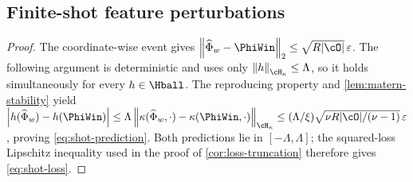\subsection{Finite-shot feature perturbations}

\begin{proof}
The coordinate-wise event gives
\(\norm{\widehat\Phi_w-\PhiWin}_2\leq\sqrt{R|\cO|}\,\varepsilon\).
The following argument is deterministic and uses only
\(\norm{h}_{\cH_\kappa}\leq\Lambda\), so it holds simultaneously for every
\(h\in\Hball\). The reproducing property and
\cref{lem:matern-stability} yield
\(
\abs{h(\widehat\Phi_w)-h(\PhiWin)}
\leq
\Lambda\norm{\kappa(\widehat\Phi_w,\cdot)-\kappa(\PhiWin,\cdot)}_{\cH_\kappa}
\leq
(\Lambda/\xi)\sqrt{\nu R|\cO|/(\nu-1)}\,\varepsilon
\), proving \cref{eq:shot-prediction}. Both predictions lie in
\([-\Lambda,\Lambda]\); the squared-loss Lipschitz inequality used in the
proof of \cref{cor:loss-truncation} therefore gives \cref{eq:shot-loss}.
\end{proof}
